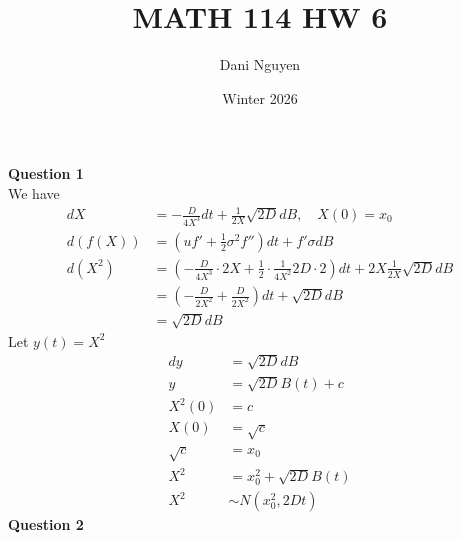 \documentclass[12pt, letterpaper]{article}
\title{MATH 114 HW 6}
\author{Dani Nguyen}
\date{Winter 2026}
\begin{document}
\maketitle
\graphicspath{ {./} }

\noindent \textbf{Question 1} \\
We have
\begin{align*}
    dX &= -\frac{D}{4X^3}dt + \frac{1}{2X}\sqrt{2D}dB,\quad X(0) = x_0 \\
    d(f(X)) &= \left(uf' + \frac 12 \sigma^2 f''\right)dt + f'\sigma dB \\
    d(X^2) &= \left(-\frac{D}{4X^3} \cdot 2X + \frac 12 \cdot \frac{1}{4X^2}2D\cdot 2 \right)dt + 2X \frac{1}{2X}\sqrt{2D}dB \\
    &= \left( -\frac{D}{2X^2} + \frac{D}{2X^2} \right)dt + \sqrt{2D}dB \\
    &= \sqrt{2D}dB
\end{align*}
Let $y(t) = X^2$
\begin{align*}
    dy &= \sqrt{2D}dB \\
    y &= \sqrt{2D}B(t) + c \\
    X^2(0) &= c \\
    X(0) &= \sqrt{c} \\
    \sqrt{c} &= x_0 \\
    X^2 &= x_0^2 + \sqrt{2D}B(t) \\
    X^2 &\sim N(x_0^2,2Dt)
\end{align*}
\newpage
\noindent \textbf{Question 2} 
\end{document}
